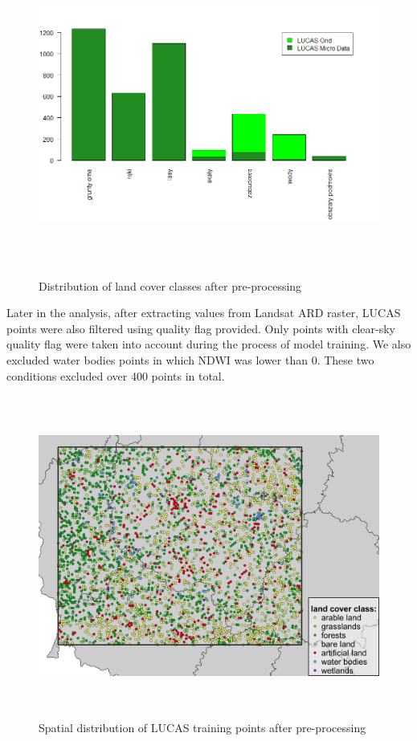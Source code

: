 \documentclass{amuthesis}
\begin{document}
\begin{figure}[t]

{\centering \includegraphics[width=1\textwidth,height=4.16667in]{./figures/lucas_data.png}

}

\caption{\label{fig-rycina2}Distribution of land cover classes after
pre-processing}

\end{figure}

Later in the analysis, after extracting values from Landsat ARD raster,
LUCAS points were also filtered using quality flag provided. Only points
with clear-sky quality flag were taken into account during the process
of model training. We also excluded water bodies points in which NDWI
was lower than 0. These two conditions excluded over 400 points in
total.

\begin{figure}[t]

{\centering \includegraphics[width=1\textwidth,height=4.16667in]{./figures/lucas_distribution.png}

}

\caption{\label{fig-rycina3}Spatial distribution of LUCAS training
points after pre-processing}

\end{figure}
\end{document}
